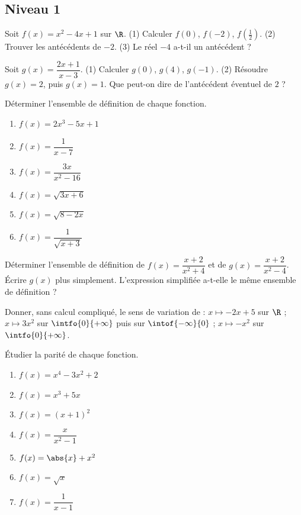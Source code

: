 \subsection*{Niveau 1}
\begin{exercise}
Soit $f(x)=x^2-4x+1$ sur $\R$. (1) Calculer $f(0)$, $f(-2)$, $f(\frac12)$. (2) Trouver les antécédents de $-2$. (3) Le réel $-4$ a-t-il un antécédent ?
\end{exercise}
\begin{exercise}
Soit $g(x)=\dfrac{2x+1}{x-3}$. (1) Calculer $g(0)$, $g(4)$, $g(-1)$. (2) Résoudre $g(x)=2$, puis $g(x)=1$. Que peut-on dire de l'antécédent éventuel de $2$ ?
\end{exercise}
\begin{exercise}
Déterminer l'ensemble de définition de chaque fonction.
\begin{enumerate}
\item $f(x)=2x^3-5x+1$
\item $f(x)=\dfrac{1}{x-7}$
\item $f(x)=\dfrac{3x}{x^2-16}$
\item $f(x)=\sqrt{3x+6}$
\item $f(x)=\sqrt{8-2x}$
\item $f(x)=\dfrac{1}{\sqrt{x+3}}$
\end{enumerate}
\end{exercise}
\begin{exercise}
Déterminer l'ensemble de définition de $f(x)=\dfrac{x+2}{x^2+4}$ et de $g(x)=\dfrac{x+2}{x^2-4}$. Écrire $g(x)$ plus simplement. L'expression simplifiée a-t-elle le même ensemble de définition ?
\end{exercise}
\begin{exercise}
Donner, sans calcul compliqué, le sens de variation de : $x\mapsto-2x+5$ sur $\R$ ; $x\mapsto3x^2$ sur $\intfo{0}{+\infty}$ puis sur $\intof{-\infty}{0}$ ; $x\mapsto-x^2$ sur $\intfo{0}{+\infty}$.
\end{exercise}
\begin{exercise}
Étudier la parité de chaque fonction.
\begin{enumerate}
\item $f(x)=x^4-3x^2+2$
\item $f(x)=x^3+5x$
\item $f(x)=(x+1)^2$
\item $f(x)=\dfrac{x}{x^2-1}$
\item $f(x)=\abs{x}+x^2$
\item $f(x)=\sqrt{x}$
\item $f(x)=\dfrac{1}{x-1}$
\end{enumerate}
\end{exercise}
